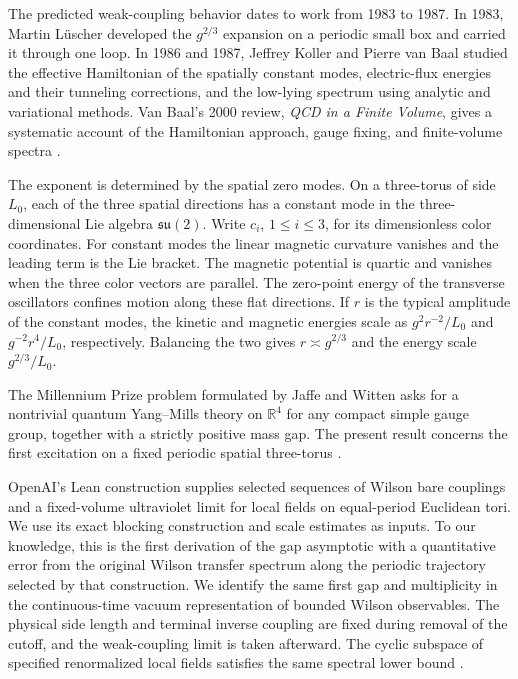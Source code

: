 \documentclass[11pt,a4paper]{article}
\numberwithin{equation}{section}
\begin{document}
The predicted weak-coupling behavior dates to work from 1983 to 1987. In 1983, Martin L\"uscher developed the \(g^{2/3}\) expansion on a periodic small box and carried it through one loop. In 1986 and 1987, Jeffrey Koller and Pierre van Baal studied the effective Hamiltonian of the spatially constant modes, electric-flux energies and their tunneling corrections, and the low-lying spectrum using analytic and variational methods. Van Baal's 2000 review, \emph{QCD in a Finite Volume}, gives a systematic account of the Hamiltonian approach, gauge fixing, and finite-volume spectra \cite{luscher-torus,koller-vanbaal,vanbaal-koller-torus,vanbaal-review}.

The exponent is determined by the spatial zero modes. On a three-torus of side \(L_0\), each of the three spatial directions has a constant mode in the three-dimensional Lie algebra \(\mathfrak{su}(2)\). Write \(c_i\), \(1\le i\le3\), for its dimensionless color coordinates. For constant modes the linear magnetic curvature vanishes and the leading term is the Lie bracket. The magnetic potential is quartic and vanishes when the three color vectors are parallel. The zero-point energy of the transverse oscillators confines motion along these flat directions. If \(r\) is the typical amplitude of the constant modes, the kinetic and magnetic energies scale as \(g^2r^{-2}/L_0\) and \(g^{-2}r^4/L_0\), respectively. Balancing the two gives \(r\asymp g^{2/3}\) and the energy scale \(g^{2/3}/L_0\).

The Millennium Prize problem formulated by Jaffe and Witten asks for a nontrivial quantum Yang--Mills theory on \(\mathbb R^4\) for any compact simple gauge group, together with a strictly positive mass gap. The present result concerns the first excitation on a fixed periodic spatial three-torus \cite{jaffe-witten}.

OpenAI's Lean construction supplies selected sequences of Wilson bare couplings and a fixed-volume ultraviolet limit for local fields on equal-period Euclidean tori. We use its exact blocking construction and scale estimates as inputs. To our knowledge, this is the first derivation of the gap asymptotic with a quantitative error from the original Wilson transfer spectrum along the periodic trajectory selected by that construction. We identify the same first gap and multiplicity in the continuous-time vacuum representation of bounded Wilson observables. The physical side length and terminal inverse coupling are fixed during removal of the cutoff, and the weak-coupling limit is taken afterward. The cyclic subspace of specified renormalized local fields satisfies the same spectral lower bound \cite{formal,armstrong}.
\end{document}
